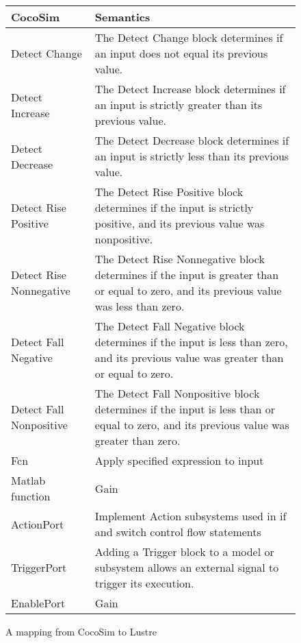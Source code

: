 \documentclass{article}
\begin{document}
\begin{figure}[t]
\centering
{
\begin{tabular}{lp{6cm}}
\hline
\textbf{CocoSim} & \textbf{Semantics}  \\
\hline

Detect Change &
The Detect Change block determines if an input does not equal its previous value.
\\

Detect Increase &
The Detect Increase block determines if an input is strictly greater than its previous value.
\\

Detect Decrease &
The Detect Decrease block determines if an input is strictly less than its previous value.
\\

Detect Rise Positive &
The Detect Rise Positive block determines if the input is strictly positive, and its previous value was nonpositive.
\\

Detect Rise Nonnegative &
The Detect Rise Nonnegative block determines if the input is greater than or equal to zero, and its previous value was less than zero.
\\

Detect Fall Negative &
The Detect Fall Negative block determines if the input is less than zero, and its previous value was greater than or equal to zero.
\\

Detect Fall Nonpositive &
The Detect Fall Nonpositive block determines if the input is less than or equal to zero, and its previous value was greater than zero.
\\


Fcn &
Apply specified expression to input
\\

Matlab function &
Gain
\\

ActionPort &
Implement Action subsystems used in if and switch control flow statements
\\

TriggerPort &
Adding a Trigger block to a model or subsystem allows an external signal to trigger its execution.
\\

EnablePort &
Gain
\\

\hline
\end{tabular}
}
\caption{A mapping from CocoSim to Lustre}
\label{mapping3}
\end{figure}
\end{document}
